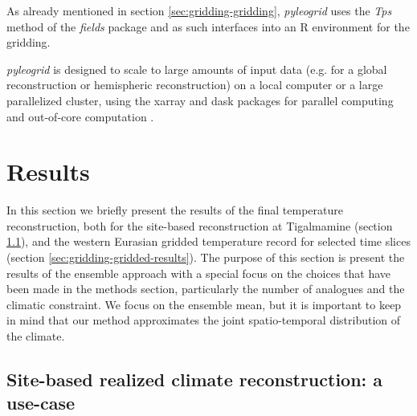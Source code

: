 \documentclass[
11pt, %
english, %
singlespacing, %
headsepline, %
]{MastersDoctoralThesis} %
\begin{document}
\begin{NoHyper}
\begin{refsection}
As already mentioned in section \ref{sec:gridding-gridding}, \textit{pyleogrid} uses the \textit{Tps} method of the \textit{fields} package \citep{NychkaFurrerPaigeEtAl2017} and as such interfaces into an R environment for the gridding.

\textit{pyleogrid} is designed to scale to large amounts of input data (e.g. for a global reconstruction or hemispheric reconstruction) on a local computer or a large parallelized cluster, using the xarray and dask packages for parallel computing and out-of-core computation \citep{HoyerHamman2017, DDT2016}.

\section{Results}  \label{sec:gridding-results}
In this section we briefly present the results of the final temperature reconstruction, both for the site-based reconstruction at Tigalmamine (section \ref{sec:gridding-site}), and the western Eurasian gridded temperature record for selected time slices (section \ref{sec:gridding-gridded-results}). The purpose of this section is present the results of the ensemble approach with a special focus on the choices that have been made in the methods section, particularly the number of analogues and the climatic constraint. We focus on the ensemble mean, but it is important to keep in mind that our method approximates the joint spatio-temporal distribution of the climate.

\subsection{Site-based realized climate reconstruction: a use-case} \label{sec:gridding-site}


\end{refsection}
\end{NoHyper}
\end{document}
